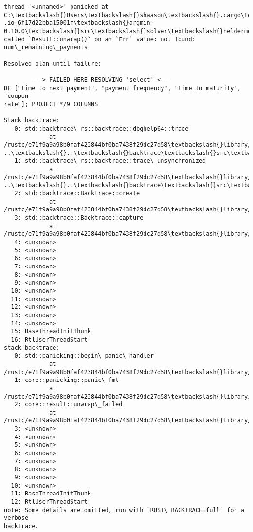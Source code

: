 \documentclass[11pt]{article}
\begin{document}
    \begin{Verbatim}[commandchars=\\\{\}]
thread '<unnamed>' panicked at C:\textbackslash{}Users\textbackslash{}shaason\textbackslash{}.cargo\textbackslash{}registry\textbackslash{}src\textbackslash{}index.crates
.io-6f17d22bba15001f\textbackslash{}argmin-0.10.0\textbackslash{}src\textbackslash{}solver\textbackslash{}neldermead\textbackslash{}mod.rs:334:53:
called `Result::unwrap()` on an `Err` value: not found: num\_remaining\_payments

Resolved plan until failure:

        ---> FAILED HERE RESOLVING 'select' <---
DF ["time to next payment", "payment frequency", "time to maturity", "coupon
rate"]; PROJECT */9 COLUMNS

Stack backtrace:
   0: std::backtrace\_rs::backtrace::dbghelp64::trace
             at /rustc/e71f9a9a98b0faf423844bf0ba7438f29dc27d58\textbackslash{}library/std\textbackslash{}src\textbackslash{}
..\textbackslash{}..\textbackslash{}backtrace\textbackslash{}src\textbackslash{}backtrace\textbackslash{}dbghelp64.rs:91
   1: std::backtrace\_rs::backtrace::trace\_unsynchronized
             at /rustc/e71f9a9a98b0faf423844bf0ba7438f29dc27d58\textbackslash{}library/std\textbackslash{}src\textbackslash{}
..\textbackslash{}..\textbackslash{}backtrace\textbackslash{}src\textbackslash{}backtrace\textbackslash{}mod.rs:66
   2: std::backtrace::Backtrace::create
             at
/rustc/e71f9a9a98b0faf423844bf0ba7438f29dc27d58\textbackslash{}library/std\textbackslash{}src\textbackslash{}backtrace.rs:331
   3: std::backtrace::Backtrace::capture
             at
/rustc/e71f9a9a98b0faf423844bf0ba7438f29dc27d58\textbackslash{}library/std\textbackslash{}src\textbackslash{}backtrace.rs:296
   4: <unknown>
   5: <unknown>
   6: <unknown>
   7: <unknown>
   8: <unknown>
   9: <unknown>
  10: <unknown>
  11: <unknown>
  12: <unknown>
  13: <unknown>
  14: <unknown>
  15: BaseThreadInitThunk
  16: RtlUserThreadStart
stack backtrace:
   0: std::panicking::begin\_panic\_handler
             at
/rustc/e71f9a9a98b0faf423844bf0ba7438f29dc27d58\textbackslash{}library/std\textbackslash{}src\textbackslash{}panicking.rs:665
   1: core::panicking::panic\_fmt
             at
/rustc/e71f9a9a98b0faf423844bf0ba7438f29dc27d58\textbackslash{}library/core\textbackslash{}src\textbackslash{}panicking.rs:76
   2: core::result::unwrap\_failed
             at
/rustc/e71f9a9a98b0faf423844bf0ba7438f29dc27d58\textbackslash{}library/core\textbackslash{}src\textbackslash{}result.rs:1699
   3: <unknown>
   4: <unknown>
   5: <unknown>
   6: <unknown>
   7: <unknown>
   8: <unknown>
   9: <unknown>
  10: <unknown>
  11: BaseThreadInitThunk
  12: RtlUserThreadStart
note: Some details are omitted, run with `RUST\_BACKTRACE=full` for a verbose
backtrace.
    \end{Verbatim}
\end{document}
